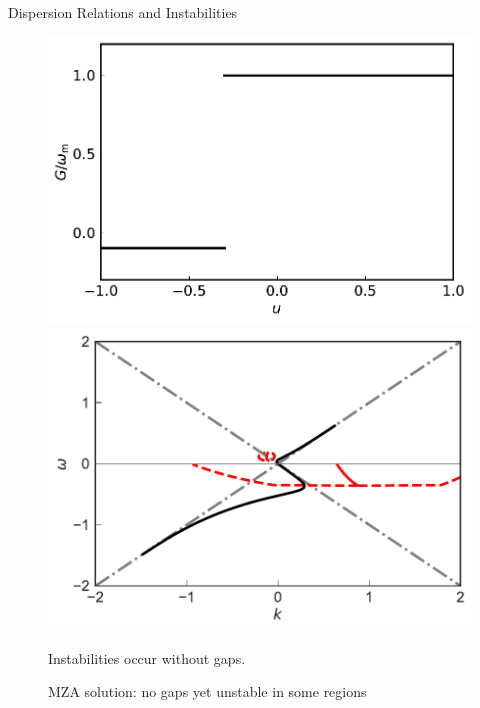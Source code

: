 \documentclass[9pt]{beamer}
\begin{document}
\begin{darkframes}
\begin{frame}{Dispersion Relations and Instabilities}
   \begin{figure}
      \includegraphics[width=\linewidth]{assets/dr/boxSpectPlt}
      \caption*{Box spectrum: $-0.1$ for $u\in [-1,-0.3)$; $1$ for $u\in [-0.3,1]$}
      \endminipage\hfill
      \includegraphics[width=\linewidth]{assets/dr/spectBoxC1MZADRPltBlob.pdf}
      \caption*{MZA solution: no gaps yet unstable in some regions}
      \endminipage\hfill
    \pause
    \begin{tcolorbox}
      \centering
      Instabilities occur without gaps.
    \end{tcolorbox}
   \end{figure}




\end{frame}
\end{darkframes}
\end{document}
